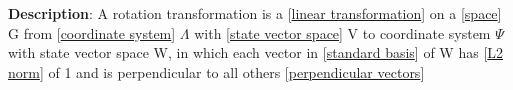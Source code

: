 \documentclass[../main.tex]{subfiles}
\begin{document}
\begin{statement}
\label{statement:Rotation Transformation}\hspace*{0pt}\par
\end{statement}
\textbf{Description}:
A rotation transformation is a [\hyperref[statement:Linear Transformation]{linear transformation}] on a [\hyperref[statement:Space]{space}] G from [\hyperref[statement:Coordinate System]{coordinate system}] $\Lambda$ with [\hyperref[statement:State Vector Space]{state vector space}] V to coordinate system $\Psi$ with state vector space W, in which each vector in [\hyperref[statement:Standard basis]{standard basis}] of W has [\hyperref[statement:L2 Norm]{L2 norm}] of 1 and is perpendicular to all others [\hyperref[statement:Perpendicular Vectors]{perpendicular vectors}]
\par
\end{document}

